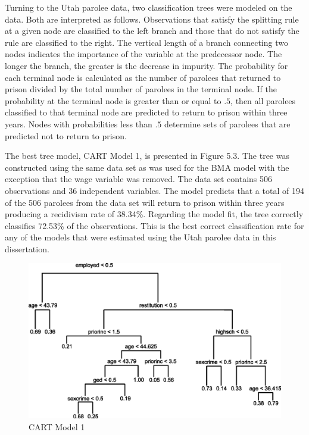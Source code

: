 Turning to the Utah parolee data, two classification trees were modeled on the data.  Both are interpreted as follows.  Observations that satisfy the splitting rule at a given node are classified to the left branch and those that do not satisfy the rule are classified to the right.  The vertical length of a branch connecting two nodes indicates the importance of the variable at the predecessor node.  The longer the branch, the greater is the decrease in impurity.  The probability for each terminal node is calculated as the number of parolees that returned to prison divided by the total number of parolees in the terminal node.  If the probability at the terminal node is greater than or equal to $.5$, then all parolees classified to that terminal node are predicted to return to prison within three years.  Nodes with probabilities less than $.5$ determine sets of parolees that are predicted not to return to prison.

The best tree model, CART Model 1, is presented in Figure 5.3.  The tree was constructed using the same data set as was used for the BMA model with the exception that the wage variable was removed.  The data set contains 506 observations and 36 independent variables.  The model predicts that a total of 194 of the 506 parolees from the data set will return to prison within three years producing a recidivism rate of 38.34\%.  Regarding the model fit, the tree correctly classifies 72.53\% of the observations.  This is the best correct classification rate for any of the models that were estimated using the Utah parolee data in this dissertation.

\begin{figure}
\begin{center}
\includegraphics[scale=1]{tree01.eps}
\vspace{0.5cm}
\caption{CART Model 1}
\end{center}
\end{figure}

